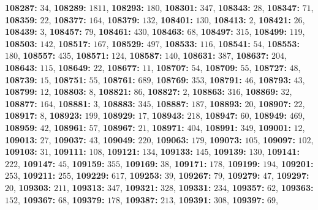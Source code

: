 \textsf{\bfseries 108287:} $34$, \textsf{\bfseries 108289:} $1811$, \textsf{\bfseries 108293:} $180$, \textsf{\bfseries 108301:} $347$, \textsf{\bfseries 108343:} $28$, \textsf{\bfseries 108347:} $71$, \textsf{\bfseries 108359:} $22$, \textsf{\bfseries 108377:} $164$, \textsf{\bfseries 108379:} $132$, \textsf{\bfseries 108401:} $130$, \textsf{\bfseries 108413:} $2$, \textsf{\bfseries 108421:} $26$, \textsf{\bfseries 108439:} $3$, \textsf{\bfseries 108457:} $79$, \textsf{\bfseries 108461:} $430$, \textsf{\bfseries 108463:} $68$, \textsf{\bfseries 108497:} $315$, \textsf{\bfseries 108499:} $119$, \textsf{\bfseries 108503:} $142$, \textsf{\bfseries 108517:} $167$, \textsf{\bfseries 108529:} $497$, \textsf{\bfseries 108533:} $116$, \textsf{\bfseries 108541:} $54$, \textsf{\bfseries 108553:} $180$, \textsf{\bfseries 108557:} $435$, \textsf{\bfseries 108571:} $124$, \textsf{\bfseries 108587:} $140$, \textsf{\bfseries 108631:} $387$, \textsf{\bfseries 108637:} $204$, \textsf{\bfseries 108643:} $115$, \textsf{\bfseries 108649:} $22$, \textsf{\bfseries 108677:} $11$, \textsf{\bfseries 108707:} $54$, \textsf{\bfseries 108709:} $55$, \textsf{\bfseries 108727:} $48$, \textsf{\bfseries 108739:} $15$, \textsf{\bfseries 108751:} $55$, \textsf{\bfseries 108761:} $689$, \textsf{\bfseries 108769:} $353$, \textsf{\bfseries 108791:} $46$, \textsf{\bfseries 108793:} $43$, \textsf{\bfseries 108799:} $12$, \textsf{\bfseries 108803:} $8$, \textsf{\bfseries 108821:} $86$, \textsf{\bfseries 108827:} $2$, \textsf{\bfseries 108863:} $316$, \textsf{\bfseries 108869:} $32$, \textsf{\bfseries 108877:} $164$, \textsf{\bfseries 108881:} $3$, \textsf{\bfseries 108883:} $345$, \textsf{\bfseries 108887:} $187$, \textsf{\bfseries 108893:} $20$, \textsf{\bfseries 108907:} $22$, \textsf{\bfseries 108917:} $8$, \textsf{\bfseries 108923:} $199$, \textsf{\bfseries 108929:} $17$, \textsf{\bfseries 108943:} $218$, \textsf{\bfseries 108947:} $60$, \textsf{\bfseries 108949:} $469$, \textsf{\bfseries 108959:} $42$, \textsf{\bfseries 108961:} $57$, \textsf{\bfseries 108967:} $21$, \textsf{\bfseries 108971:} $404$, \textsf{\bfseries 108991:} $349$, \textsf{\bfseries 109001:} $12$, \textsf{\bfseries 109013:} $27$, \textsf{\bfseries 109037:} $43$, \textsf{\bfseries 109049:} $220$, \textsf{\bfseries 109063:} $179$, \textsf{\bfseries 109073:} $105$, \textsf{\bfseries 109097:} $102$, \textsf{\bfseries 109103:} $31$, \textsf{\bfseries 109111:} $108$, \textsf{\bfseries 109121:} $134$, \textsf{\bfseries 109133:} $145$, \textsf{\bfseries 109139:} $130$, \textsf{\bfseries 109141:} $222$, \textsf{\bfseries 109147:} $45$, \textsf{\bfseries 109159:} $355$, \textsf{\bfseries 109169:} $38$, \textsf{\bfseries 109171:} $178$, \textsf{\bfseries 109199:} $194$, \textsf{\bfseries 109201:} $253$, \textsf{\bfseries 109211:} $255$, \textsf{\bfseries 109229:} $617$, \textsf{\bfseries 109253:} $39$, \textsf{\bfseries 109267:} $79$, \textsf{\bfseries 109279:} $47$, \textsf{\bfseries 109297:} $20$, \textsf{\bfseries 109303:} $211$, \textsf{\bfseries 109313:} $347$, \textsf{\bfseries 109321:} $328$, \textsf{\bfseries 109331:} $234$, \textsf{\bfseries 109357:} $62$, \textsf{\bfseries 109363:} $152$, \textsf{\bfseries 109367:} $68$, \textsf{\bfseries 109379:} $178$, \textsf{\bfseries 109387:} $213$, \textsf{\bfseries 109391:} $308$, \textsf{\bfseries 109397:} $69$, 
